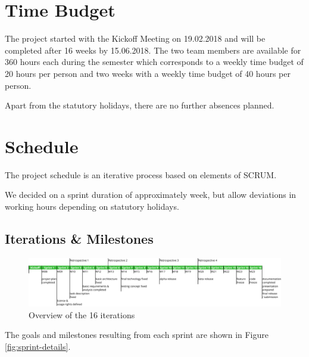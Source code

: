\section{Time Budget}
The project started with the Kickoff Meeting on 19.02.2018 and will be completed after 16 weeks by 15.06.2018.
The two team members are available for 360 hours each during the semester which corresponds to a weekly time budget of 20 hours per person and two weeks with a weekly time budget of 40 hours per person.

Apart from the statutory holidays, there are no further absences planned.

\section{Schedule}
The project schedule is an iterative process based on elements of SCRUM.

We decided on a sprint duration of approximately week, but allow deviations in working hours depending on statutory holidays. %

\subsection{Iterations \& Milestones}
\begin{figure}[h!]
    \centering
    \includegraphics[width=1\linewidth]{resources/overview}
    \caption{Overview of the 16 iterations}
    \label{fig:overview}
\end{figure}

The goals and milestones resulting from each sprint are shown in Figure \ref{fig:sprint-details}.

